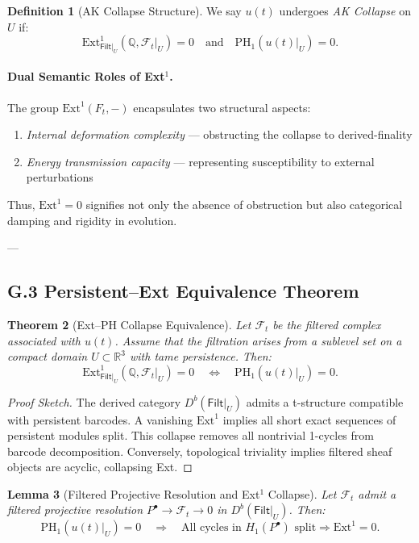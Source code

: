 \documentclass[11pt]{article}
\newtheorem{theorem}{Theorem}[section]
\newtheorem{lemma}[theorem]{Lemma}
\theoremstyle{definition}
\newtheorem{definition}[theorem]{Definition}
\begin{document}
\begin{definition}[AK Collapse Structure]
We say $u(t)$ undergoes \emph{AK Collapse} on $U$ if:
\[
\mathrm{Ext}^1_{\mathsf{Filt}|_U}(\mathbb{Q}, \mathcal{F}_t|_U) = 0 \quad \text{and} \quad \mathrm{PH}_1(u(t)|_U) = 0.
\]
\end{definition}

\paragraph{Dual Semantic Roles of Ext$^1$.}
The group $\mathrm{Ext}^1(F_t, -)$ encapsulates two structural aspects:
\begin{enumerate}
    \item \emph{Internal deformation complexity} — obstructing the collapse to derived-finality
    \item \emph{Energy transmission capacity} — representing susceptibility to external perturbations
\end{enumerate}
Thus, $\mathrm{Ext}^1 = 0$ signifies not only the absence of obstruction but also categorical damping and rigidity in evolution.

---

\subsection*{G.3 Persistent–Ext Equivalence Theorem}

\begin{theorem}[Ext–PH Collapse Equivalence]
Let $\mathcal{F}_t$ be the filtered complex associated with $u(t)$.  
Assume that the filtration arises from a sublevel set on a compact domain $U \subset \mathbb{R}^3$ with tame persistence.  
Then:
\[
\mathrm{Ext}^1_{\mathsf{Filt}|_U}(\mathbb{Q}, \mathcal{F}_t|_U) = 0 \quad \Longleftrightarrow \quad \mathrm{PH}_1(u(t)|_U) = 0.
\]
\end{theorem}

\begin{proof}[Proof Sketch]
The derived category $D^b(\mathsf{Filt}|_U)$ admits a t-structure compatible with persistent barcodes.  
A vanishing $\mathrm{Ext}^1$ implies all short exact sequences of persistent modules split.  
This collapse removes all nontrivial 1-cycles from barcode decomposition.  
Conversely, topological triviality implies filtered sheaf objects are acyclic, collapsing Ext.
\end{proof}

\begin{lemma}[Filtered Projective Resolution and Ext$^1$ Collapse]
Let $\mathcal{F}_t$ admit a filtered projective resolution \( P^\bullet \to \mathcal{F}_t \to 0 \) in \( D^b(\mathsf{Filt}|_U) \).  
Then:
\[
\mathrm{PH}_1(u(t)|_U) = 0 \quad \Rightarrow \quad \text{All cycles in } H_1(P^\bullet) \text{ split} \Rightarrow \mathrm{Ext}^1 = 0.
\]
\end{lemma}
\end{document}

